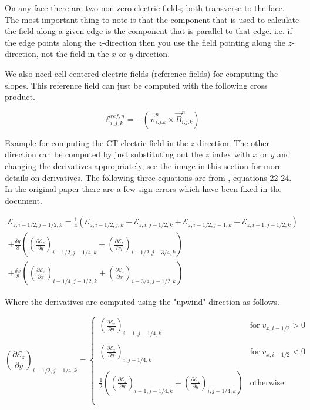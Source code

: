 On any face there are two non-zero electric fields; both transverse to the face. The most important thing to note is that the component that is used to calculate the field along a given edge is the component that is parallel to that edge. i.e. if the edge points along the $ z $-direction then you use the field pointing along the $ z $-direction, not the field in the $ x $ or $ y $ direction.

We also need cell centered electric fields (reference fields) for computing the slopes. This reference field can just be computed with the following cross product.

$$
    \mathcal{E}_{i,j,k}^{ref,n} = - \left( \vec{v}^{n}_{i.j.k} \times \vec{B}^{n}_{i.j.k} \right)
$$

Example for computing the CT electric field in the $ z $-direction. The other direction can be computed by just substituting out the $ z $ index with $ x $ or $ y $ and changing the derivatives appropriately, see the image in this section for more details on derivatives. The following three equations are from \citeyear[Stone \& Gardiner][]{stone_2009}, equations 22-24. In the original paper there are a few sign errors which have been fixed in the document.

$$
    \begin{aligned}
        \mathcal{E}_{z, i-1/2, j-1/2, k} = \frac{1}{4} \left(
              \mathcal{E}_{z, i-1/2, j, k}
            + \mathcal{E}_{z, i, j-1/2, k}
            + \mathcal{E}_{z, i-1/2, j-1, k}
            + \mathcal{E}_{z, i-1, j-1/2, k}\right) \\
        + \frac{\delta y}{8} \left( \left( \frac{\partial \mathcal{E}_z }{\partial y} \right)_{i-1/2, j-1/4, k} + \left(  \frac{\partial \mathcal{E}_z }{\partial y} \right)_{i-1/2, j-3/4, k} \right) \\
        + \frac{\delta x}{8} \left( \left( \frac{\partial \mathcal{E}_z }{\partial x} \right)_{i-1/4, j-1/2, k} + \left(  \frac{\partial \mathcal{E}_z }{\partial x} \right)_{i-3/4, j-1/2, k} \right)
    \end{aligned}
$$

Where the derivatives are computed using the "upwind" direction as follows.

$$
    \left( \frac{\partial \mathcal{E}_z }{\partial y} \right)_{i-1/2, j-1/4, k} =
        \begin{cases}
            \left( \frac{\partial \mathcal{E}_z }{\partial y} \right)_{i-1, j-1/4, k} & \text{for} \; v_{x, i-1/2} > 0
            \\
            \\
            \left( \frac{\partial \mathcal{E}_z }{\partial y} \right)_{i, j-1/4, k} & \text{for} \; v_{x, i-1/2} < 0
            \\
            \\
            \frac{1}{2} \left( \left( \frac{\partial \mathcal{E}_z }{\partial y} \right)_{i-1, j-1/4, k} + \left( \frac{\partial \mathcal{E}_z }{\partial y} \right)_{i, j-1/4, k} \right) & \text{otherwise}
            \\
            \\
        \end{cases}
$$


